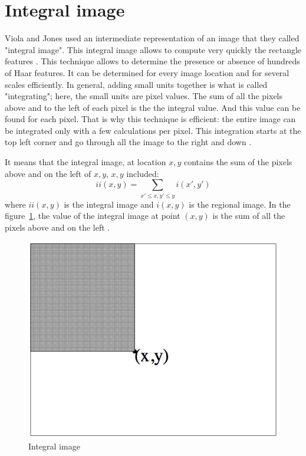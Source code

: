 \section{Integral image}

\vspace{\baselineskip}
\noindent Viola and Jones used an intermediate representation of an image that they called "integral image". This integral image allows to compute very quickly the rectangle features \cite{VIO01}. This technique allows to determine the presence or absence of hundreds of Haar features. It can be determined for every image location and for several scales efficiently. In general, adding small units together is what is called "integrating"; here, the small units are pixel values. The sum of all the pixels above and to the left of each pixel is the the integral value. And this value can be found for each pixel. That is why this technique is efficient: the entire image can be integrated only with a few calculations per pixel. This integration starts at the top left corner and go through all the image to the right and down \cite{HEW07}.
\newline

\noindent It means that the integral image, at location $ x,y $ contains the sum of the pixels above and on the left of $ x,y $, $ x,y$ included: \[ ii(x,y) = \sum_{x' \leq x,y' \leq y} i(x',y') \] where $ ii(x,y) $ is the integral image and $ i(x,y) $ is the regional image. In the figure~\ref{integral_image_description}, the value of the integral image at point $ (x,y) $ is the sum of all the pixels above and on the left \cite{VIO01}. 
\newline
	
\begin{figure}[!h]
\begin{center}
\noindent \includegraphics[scale=0.5]{figures/integral_image_description} 
\newline
\caption{Integral image}
\label{integral_image_description}
\end{center} 
\end{figure}
	
